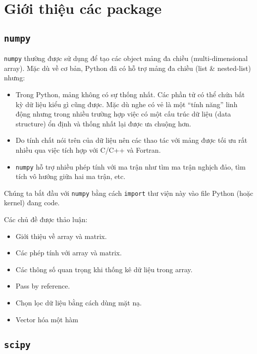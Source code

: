 \documentclass[12pt, a4paper, twoside]{article}
\begin{document}
\section{Giới thiệu các package}
\subsection{\texttt{numpy}}
\texttt{numpy} thường được sử dụng để tạo các object mảng đa chiều (multi-dimensional array). Mặc dù về cơ bản, Python đã có hỗ trợ mảng đa chiều (list \& nested-list) nhưng:
\begin{itemize}
    \item Trong Python, mảng không có sự thống nhất. Các phần tử có thể chứa bất kỳ dữ liệu kiểu gì cũng được. Mặc dù nghe có vẻ là một ``tính năng'' linh động nhưng trong nhiều trường hợp việc có một cấu trúc dữ liệu (data structure) ổn định và thống nhất lại được ưa chuộng hơn.
    \item Do tính chất nói trên của dữ liệu nên các thao tác với mảng được tối ưu rất nhiều qua việc tích hợp với C/C++ và Fortran.
    \item \texttt{numpy} hỗ trợ nhiều phép tính với ma trận như tìm ma trận nghịch đảo, tìm tích vô hướng giữa hai ma trận, etc.
\end{itemize}
Chúng ta bắt đầu với \texttt{numpy} bằng cách \texttt{import} thư viện này vào file Python (hoặc kernel) đang code.

Các chủ đề được thảo luận:
\begin{itemize}
    \item Giới thiệu về array và matrix.
    \item Các phép tính với array và matrix.
    \item Các thông số quan trọng khi thống kê dữ liệu trong array.
    \item Pass by reference.
    \item Chọn lọc dữ liệu bằng cách dùng mặt nạ.
    \item Vector hóa một hàm
\end{itemize}

\subsection{\texttt{scipy}}
\end{document}
